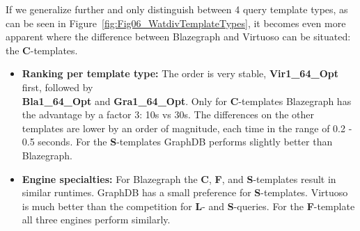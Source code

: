 If we generalize further and only distinguish between 4 query template types, as can be seen  in Figure~\ref{fig:Fig06_WatdivTemplateTypes}, it becomes even more apparent where the difference between Blazegraph and Virtuoso can be situated: the \textbf{C}-templates.
\begin{itemize}
	\item \textbf{Ranking per template type:} The order is very stable, \textbf{Vir1\_64\_Opt} first, followed by  \\ \textbf{Bla1\_64\_Opt} and \textbf{Gra1\_64\_Opt}. Only for \textbf{C}-templates Blazegraph has the advantage  by a factor 3: 10s vs 30s. The differences on the other templates are lower by an order of magnitude, each time in the range of 0.2 - 0.5 seconds. For the \textbf{S}-templates GraphDB performs slightly better than Blazegraph.
	\item \textbf{Engine specialties:} For Blazegraph the \textbf{C}, \textbf{F}, and \textbf{S}-templates result in similar runtimes. GraphDB has a small preference for \textbf{S}-templates. Virtuoso is much better than the competition for \textbf{L}- and \textbf{S}-queries. For the \textbf{F}-template all three engines perform similarly.
\end{itemize}

